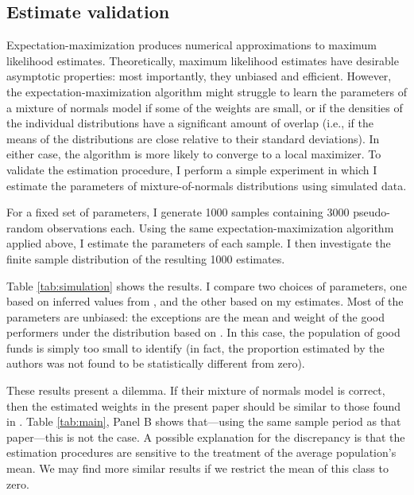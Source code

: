 	\subsection{Estimate validation}
		Expectation-maximization produces numerical approximations to maximum likelihood estimates. Theoretically, maximum likelihood estimates have desirable asymptotic properties: most importantly, they unbiased and efficient.  However, the expectation-maximization algorithm might struggle to learn the parameters of a mixture of normals model if some of the weights are small, or if the densities of the individual distributions have a significant amount of overlap (i.e., if the means of the distributions are close relative to their standard deviations). In either case, the algorithm is more likely to converge to a local maximizer. To validate the estimation procedure, I perform a simple experiment in which I estimate the parameters of mixture-of-normals distributions using simulated data.

		For a fixed set of parameters, I generate 1000 samples containing 3000 pseudo-random observations each. Using the same expectation-maximization algorithm applied above, I estimate the parameters of each sample. I then investigate the finite sample distribution of the resulting 1000 estimates.

		Table \ref{tab:simulation} shows the results. I compare two choices of parameters, one based on inferred values from \citet{Barras2010}, and the other based on my estimates. Most of the parameters are unbiased: the exceptions are the mean and weight of the good performers under the distribution based on \citet{Barras2010}.  In this case, the population of good funds is simply too small to identify (in fact, the proportion estimated by the authors was not found to be statistically different from zero).

		These results present a dilemma. If their mixture of normals model is correct, then the estimated weights in the present paper should be similar to those found in \citet{Barras2010}. Table \ref{tab:main}, Panel B shows that---using the same sample period as that paper---this is not the case.  A possible explanation for the discrepancy is that the estimation procedures are sensitive to the treatment of the average population's mean.  We may find more similar results if we restrict the mean of this class to zero.

